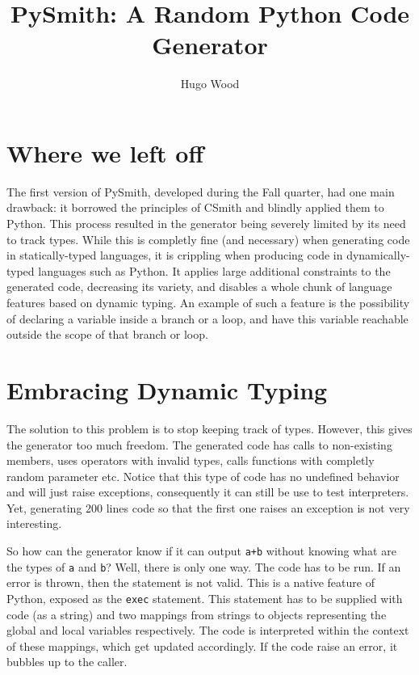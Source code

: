 \documentclass[10pt,twocolumn]{article}
\title{PySmith: A Random Python Code Generator}
\author{Hugo Wood}
\begin{document}
\maketitle

\section*{Where we left off}

The first version of PySmith, developed during the Fall quarter, had one main 
drawback: it borrowed the principles of CSmith and blindly applied them to 
Python. This process resulted in the generator being severely limited by its 
need to track types. While this is completly fine (and necessary) when 
generating code in statically-typed languages, it is crippling when producing 
code in dynamically-typed languages such as Python. It applies large additional 
constraints to the generated code, decreasing its variety, and disables a whole 
chunk of language features based on dynamic typing. An example of such a feature
is the possibility of declaring a variable inside a branch or a loop, and have 
this variable reachable outside the scope of that branch or loop.

\section*{Embracing Dynamic Typing}

The solution to this problem is to stop keeping track of types. However,
this gives the generator too much freedom. The generated code has calls to 
non-existing members, uses operators with invalid types, calls functions with 
completly random parameter etc. Notice that this type of code has no undefined
behavior and will just raise exceptions, consequently it can still be use to 
test interpreters. Yet, generating 200 lines code so that the first one raises
an exception is not very interesting.

So how can the generator know if it can output \verb|a+b| without knowing what 
are the types of \verb|a| and \verb|b|? Well, there is only one way. The code 
has to be run. If an error is thrown, then the statement is not valid. This 
is a native feature of Python, exposed as the \verb|exec| statement. This 
statement has to be supplied with code (as a string) and two mappings from 
strings to objects representing the global and local variables respectively.
The code is interpreted within the context of these mappings, which get updated
accordingly. If the code raise an error, it bubbles up to the caller.
\end{document}
